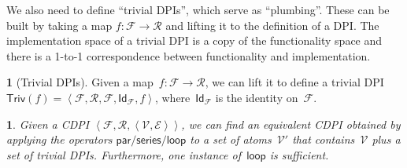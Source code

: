 \documentclass[twocolumn,english]{IEEEtran}
\theoremstyle{definition}
\newtheorem{defn}{\protect\definitionname}
\theoremstyle{plain}
\theoremstyle{definition}
\theoremstyle{remark}
\theoremstyle{definition}
\theoremstyle{plain}
\newtheorem{prop}{\protect\propositionname}
\theoremstyle{plain}
\newcommand{\idFunc}{\aword{Id}}
\newcommand{\aword}[1]{\mathsf{#1}}
\newcommand{\vmath}[1]{\aword{#1}}
\newcommand{\funsp}{\mathscr{F}}
\newcommand{\ressp}{\mathscr{R}}
\newcommand{\dpseries}{\vmath{series}}
\newcommand{\dppar}{\vmath{par}}
\newcommand{\dploop}{\vmath{loop}}
\newcommand{\cdpiN}{\mathcal{V}}
\newcommand{\triv}{\mathsf{Triv}}
\providecommand{\definitionname}{Definition}
\providecommand{\propositionname}{Proposition}
\begin{document}
We also need to define ``trivial DPIs'', which serve as ``plumbing''.
These can be built by taking a map $f:\funsp\rightarrow\ressp$ and
lifting it to the definition of a DPI. The implementation space of
a trivial DPI is a copy of the functionality space and there is a
1-to-1 correspondence between functionality and implementation.
\begin{defn}[Trivial DPIs]
Given a map~$f:\funsp\rightarrow\ressp$, we can lift it to define
a trivial DPI $\triv(f)=\left\langle \funsp,\ressp,\funsp,\idFunc_{\funsp},f\right\rangle $,
where~$\idFunc_{\funsp}$ is the identity on~$\funsp$. 
\end{defn}
\begin{prop}
\label{prop:reduction}Given a CDPI $\left\langle \funsp,\ressp,\left\langle \cdpiN,\mathcal{E}\right\rangle \right\rangle $,
we can find an equivalent CDPI obtained by applying the operators
$\dppar/\dpseries/\dploop$ to a set of atoms~$\cdpiN'$ that contains~$\cdpiN$
plus a set of trivial DPIs. Furthermore, one instance of~$\dploop$
is sufficient.
\end{prop}
\end{document}
